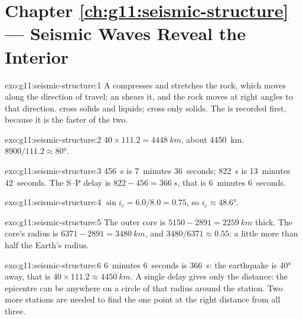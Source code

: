 \section*{Chapter \ref{ch:g11:seismic-structure} --- Seismic Waves Reveal the Interior}

\begin{solution}{exo:g11:seismic-structure:1}
A  compresses and stretches the rock, which moves along the direction
of travel; an  shears it, and the rock moves at right angles to that
direction.  cross solids and liquids;  cross only solids. The  is recorded first, because it is the faster of the two.
\end{solution}

\begin{solution}{exo:g11:seismic-structure:2}
$40 \times 111.2 = \qty{4448}{km}$, about \qty{4450}{km}. $8900/111.2
\approx \ang{80}$.
\end{solution}

\begin{solution}{exo:g11:seismic-structure:3}
\qty{456}{s} is 7~minutes 36~seconds; \qty{822}{s} is 13~minutes
42~seconds. The S--P delay is $822 - 456 = \qty{366}{s}$, that is 6~minutes
6~seconds.
\end{solution}

\begin{solution}{exo:g11:seismic-structure:4}
$\sin i_c = 6.0/8.0 = 0.75$, so $i_c \approx \ang{48.6}$.
\end{solution}

\begin{solution}{exo:g11:seismic-structure:5}
The outer core is $5150 - 2891 = \qty{2259}{km}$ thick. The core's radius is
$6371 - 2891 = \qty{3480}{km}$, and $3480/6371 \approx 0.55$: a little more
than half the Earth's radius.
\end{solution}

\begin{solution}{exo:g11:seismic-structure:6}
6~minutes 6~seconds is \qty{366}{s}: the earthquake is \ang{40} away, that is
$40 \times 111.2 \approx \qty{4450}{km}$. A single delay gives only the
distance: the epicentre can be anywhere on a circle of that radius around the
station. Two more stations are needed to find the one point at the right
distance from all three.
\end{solution}

